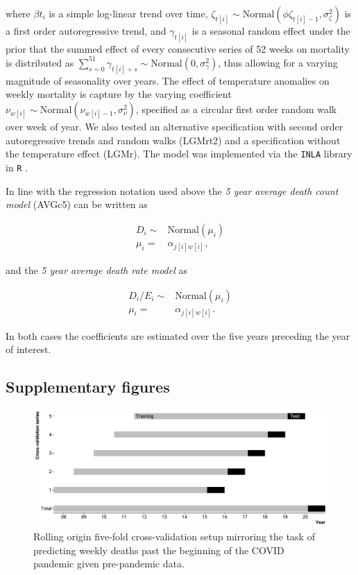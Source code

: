 \documentclass[12pt]{article}
\begin{document}
\begin{appendix}
where $\beta t_i$ is a simple log-linear trend over time, $\zeta_{t[i]} \sim \text{Normal}(\phi \zeta_{t[i]-1}, \sigma^2_\zeta)$ is a first order autoregressive trend, and $\gamma_{t[i]}$ is a seasonal random effect under the prior that the summed effect of every consecutive series of 52 weeks on mortality is distributed as $\sum_{s=0}^{51} \gamma_{t[i]+s} \sim \text{Normal}(0, \sigma^2_\gamma)$, thus allowing for a varying magnitude of seasonality over years. The effect of temperature anomalies on weekly mortality is capture by the varying coefficient $\nu_{w[i]} \sim \text{Normal}(\nu_{w[i]-1}, \sigma^2_\nu)$, specified as a circular first order random walk over week of year. We also tested an alternative specification with second order autoregressive trends and random walks (LGMrt2) and a specification without the temperature effect (LGMr). The model was implemented via the \texttt{INLA} library in \texttt{R} \cite{Rue2009, Rue2021}.

In line with the regression notation used above the \emph{5 year average death count model} (AVGc5) can be written as

\begin{equation}
  \begin{aligned}
    D_i \sim& \text{Normal}(\mu_i) \\
    \mu_i =& \alpha_{j[i]w[i]},
  \end{aligned}
  \label{eq:avgc}
\end{equation}

and the \emph{5 year average death rate model} as

\begin{equation}
  \begin{aligned}
    D_i/E_i \sim& \text{Normal}(\mu_i) \\
    \mu_i =& \alpha_{j[i]w[i]}.
  \end{aligned}
  \label{eq:avgr}
\end{equation}

In both cases the coefficients are estimated over the five years preceding the year of interest.

\clearpage

\subsection*{Supplementary figures}

\begin{figure}
\caption{Rolling origin five-fold cross-validation setup mirroring the task of predicting weekly deaths past the beginning of the COVID pandemic given pre-pandemic data.}
\includegraphics{cvsetup.pdf}
\end{figure}


\end{appendix}
\end{document}
